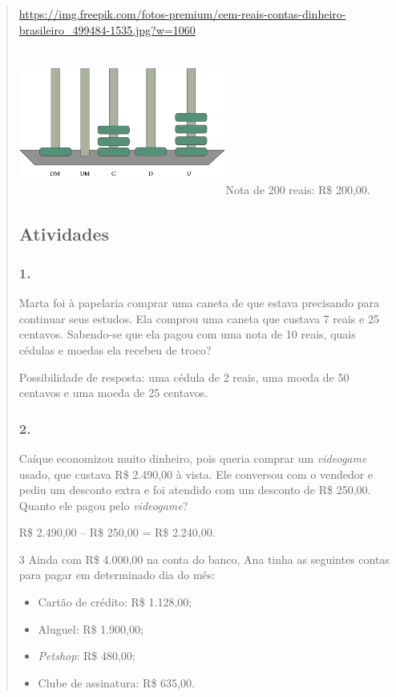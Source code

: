 \begin{enumerate}
\begin{escolha}
\begin{enumerate}
\begin{itemize}
\begin{itemize}
\begin{escolha}
\begin{quote}
\url{https://img.freepik.com/fotos-premium/cem-reais-contas-dinheiro-brasileiro_499484-1535.jpg?w=1060}

\includegraphics[width=2.68333in,height=1.88913in]{media/image80.png}Nota
de 200 reais: R\$ 200,00.

\subsection{Atividades}\label{atividades-5}

\subsubsection{1.}\label{section-65}

Marta foi à papelaria comprar uma caneta de que estava precisando para
continuar seus estudos. Ela comprou uma caneta que custava 7 reais e 25
centavos. Sabendo-se que ela pagou com uma nota de 10 reais, quais
cédulas e moedas ela recebeu de troco?

Possibilidade de resposta: uma cédula de 2 reais, uma moeda de 50 centavos e uma moeda de 25 centavos.

\subsubsection{2.}\label{section-66}

Caíque economizou muito dinheiro, pois queria comprar um \textit{videogame} usado,
que custava R\$ 2.490,00 à vista. Ele conversou com o vendedor e pediu
um desconto extra e foi atendido com um desconto de R\$ 250,00. Quanto
ele pagou pelo \textit{videogame}?

R\$ 2.490,00 -- R\$ 250,00 = R\$ 2.240,00.

\num{3} Ainda com R\$ 4.000,00 na conta do banco, Ana tinha as seguintes contas para pagar em determinado dia do mês:

\begin{itemize}
  \item Cartão de crédito: R\$ 1.128,00;
  \item Aluguel: R\$ 1.900,00;
  \item \textit{Petshop}: R\$ 480,00;
  \item Clube de assinatura: R\$ 635,00.
\end{itemize}


\end{quote}
\end{escolha}
\end{itemize}
\end{itemize}
\end{enumerate}
\end{escolha}
\end{enumerate}
